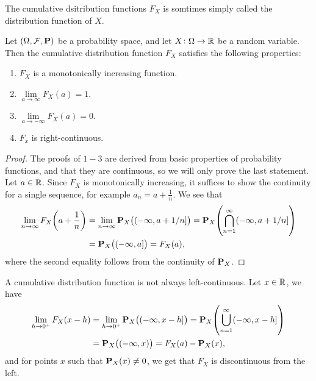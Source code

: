 \documentclass[11pt,a4paper]{article}
\begin{document}
\begin{remark}
  The cumulative dsitribution functions $F_X$
  is somtimes simply called the distribution function of $X$.
\end{remark}

\begin{proposition}
  \label{prop:cdf-properties}
  Let $(\Omega, \mathcal F, \mathbf{P})$ be a probability space,
  and let $X \colon \Omega \to \mathbb{R}$ be a random variable.
  Then the cumulative distribution
  function $F_X$ satisfies the following properties:
  \begin{enumerate}
    \item[(1)] $F_X$ is a monotonically increasing function.
    \item[(2)] $\lim\limits_{a \to \infty} F_X(a) = 1$.
    \item[(3)] $\lim\limits_{a \to -\infty} F_X(a) = 0$.
    \item[(4)] $F_x$ is right-continuous.
  \end{enumerate}
\end{proposition}
\begin{proof}
  The proofs of $1-3$ are derived from basic properties of probability
  functions, and that they are continuous, so we will only prove the last
  statement.
  Let $a \in \mathbb{R}$.
  Since $F_X$ is monotonically increasing, it suffices to show the continuity
  for a single sequence, for example $a_n = a + \frac{1}{n}$. We see
  that
  \begin{align*}
    \lim_{n\to\infty} F_{X} {\left(a+\frac{1}{n}\right)} &=
    \lim_{n\to\infty} \mathbf{P}_{X}{\left((-\infty,a+1/n]\right)} =
    \mathbf{P}_{X}{\left(\bigcap_{n=1}^{\infty}(-\infty,a+1/n]\right)} \\ &=
    \mathbf{P}_{X}{\left((-\infty,a]\right)} =
    F_{X}(a),
  \end{align*}
  where the second equality follows from the continuity of $\mathbf{P}_X$.
\end{proof}

\begin{remark}
  \label{rmk:continuous-random-variable}
  A cumulative distribution function is not always left-continuous.
  Let $x \in \mathbb{R}$, we have
  \begin{align*}
    \lim_{h \to 0^+} F_{X}(x - h) &=
    \lim_{h \to 0^+} \mathbf{P}_{X}{\left((-\infty,x - h]\right)} =
    \mathbf{P}_{X}{\left(\bigcup_{n=1}^{\infty}(-\infty,x - h]\right)} \\ &=
    \mathbf{P}_{X}{\left((-\infty,x)\right)} =
    F_{X}(a) - \mathbf{P}_X(x),
  \end{align*}
  and for points $x$ such that $\mathbf{P}_X(x) \neq 0$,
  we get that $F_X$ is discontinuous from the left.
\end{remark}
\end{document}
